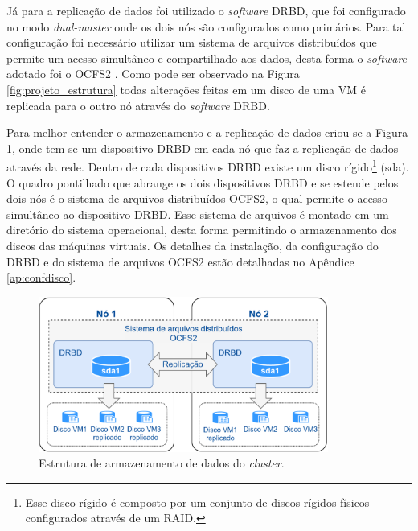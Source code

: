 Já para a replicação de dados foi utilizado o \textit{software} \ac{DRBD}, que foi configurado no modo \textit{dual-master} onde os dois nós 
são configurados como primários. Para tal configuração foi necessário utilizar um sistema de arquivos distribuídos que permite um acesso 
simultâneo e compartilhado aos dados, desta forma o \textit{software} adotado foi o \ac{OCFS2} \cite{ocfs2}. 
Como pode ser observado na Figura \ref{fig:projeto_estrutura} todas alterações feitas em um disco de uma \ac{VM} é replicada para o 
outro nó através do \textit{software} \ac{DRBD}. 

Para melhor entender o armazenamento e a replicação de dados criou-se a Figura \ref{fig:projeto_discos}, onde tem-se um dispositivo \ac{DRBD}
em cada nó que faz a replicação de dados através da rede. Dentro de cada dispositivos \ac{DRBD} existe um disco rígido\footnote[1]{Esse disco 
rígido é composto por um conjunto de discos rígidos físicos configurados através de um \ac{RAID}.} (sda). O quadro pontilhado que abrange os 
dois dispositivos \ac{DRBD} e se estende pelos dois nós é o sistema de arquivos distribuídos \ac{OCFS2}, o qual permite o acesso simultâneo ao 
dispositivo \ac{DRBD}. Esse sistema de arquivos é montado em um diretório do sistema operacional, desta forma permitindo o armazenamento 
dos discos das máquinas virtuais. Os detalhes da instalação, da configuração do \ac{DRBD} e do sistema de arquivos \ac{OCFS2} 
estão detalhadas no Apêndice \ref{ap:confdisco}. 

\begin{figure}[h!]
 \centering
 \includegraphics[width=360px]{img/projeto_discos.eps}
 \caption{Estrutura de armazenamento de dados do \textit{cluster}.}
 \label{fig:projeto_discos}
\end{figure}


